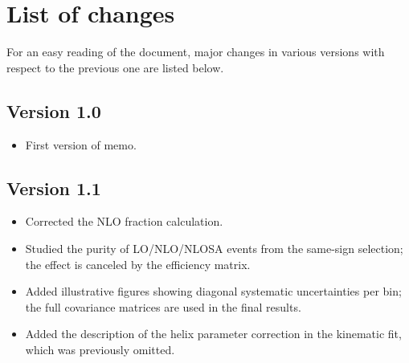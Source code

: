 \section*{List of changes}
\label{sec:changes}

For an easy reading of the document, major changes in various versions with respect to the previous one are listed below.

\subsection*{Version 1.0}
\begin{itemize}
\item First version of memo.
\end{itemize}

\subsection*{Version 1.1}
\begin{itemize}
\item Corrected the NLO fraction calculation.
\item Studied the purity of LO/NLO/NLOSA events from the same-sign selection; the effect is canceled by the efficiency matrix.
\item Added illustrative figures showing diagonal systematic uncertainties per bin; the full covariance matrices are used in the final results.
\item Added the description of the helix parameter correction in the kinematic fit, which was previously omitted.
\end{itemize}